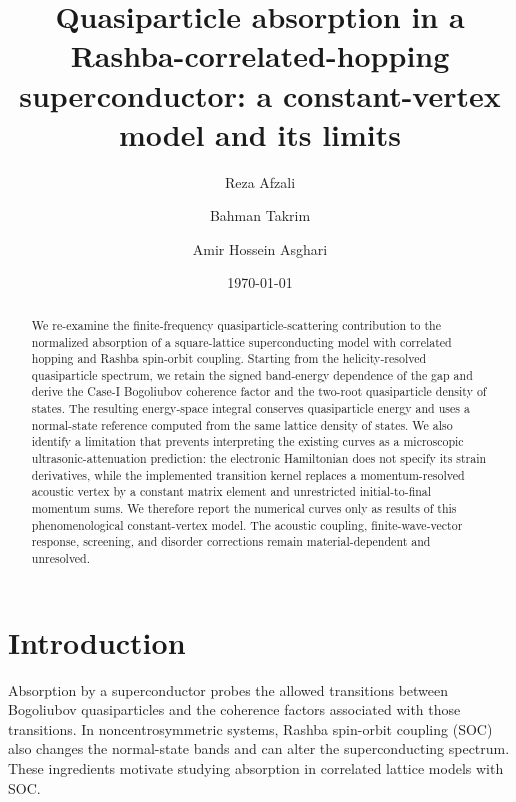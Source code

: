 \documentclass[aps,prb,reprint,superscriptaddress]{revtex4-2}
\begin{document}
\title{Quasiparticle absorption in a Rashba-correlated-hopping superconductor: a constant-vertex model and its limits}

\author{Reza Afzali}
\author{Bahman Takrim}
\author{Amir Hossein Asghari}

\date{\today}

\begin{abstract}
We re-examine the finite-frequency quasiparticle-scattering contribution to the normalized absorption of a square-lattice superconducting model with correlated hopping and Rashba spin-orbit coupling. Starting from the helicity-resolved quasiparticle spectrum, we retain the signed band-energy dependence of the gap and derive the Case-I Bogoliubov coherence factor and the two-root quasiparticle density of states. The resulting energy-space integral conserves quasiparticle energy and uses a normal-state reference computed from the same lattice density of states. We also identify a limitation that prevents interpreting the existing curves as a microscopic ultrasonic-attenuation prediction: the electronic Hamiltonian does not specify its strain derivatives, while the implemented transition kernel replaces a momentum-resolved acoustic vertex by a constant matrix element and unrestricted initial-to-final momentum sums. We therefore report the numerical curves only as results of this phenomenological constant-vertex model. The acoustic coupling, finite-wave-vector response, screening, and disorder corrections remain material-dependent and unresolved.
\end{abstract}

\maketitle

\section{Introduction}

Absorption by a superconductor probes the allowed transitions between Bogoliubov quasiparticles and the coherence factors associated with those transitions. In noncentrosymmetric systems, Rashba spin-orbit coupling (SOC) also changes the normal-state bands and can alter the superconducting spectrum. These ingredients motivate studying absorption in correlated lattice models with SOC.
\end{document}
